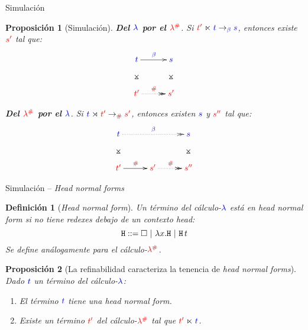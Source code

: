 \documentclass{beamer}
\newtheorem{defes}{Definición}
\newtheorem{proes}{Proposición}
\newcommand{\cLam}[1]{{\color{darkBlue} #1}}
\newcommand{\cDist}[1]{{\color{red} #1}}
\newcommand{\clambdadist}{\cDist{\lambdadist}}
\newcommand{\clambda}{\cLam{\lambda}}
\begin{document}
\begin{frame}{Simulación}
\begin{proes}[Simulación]
\textbf{Del $\clambda$ por el $\clambdadist$}.
Si $\cDist{\tm'} \refines \cLam{\tm} \to_{\cLam{\beta}} \cLam{\tmtwo}$,
entonces existe $\cDist{\tmtwo'}$ tal que:
\[
\xymatrix@=1cm{
 \cLam{\tm} \ar@{}[d]|*=0[@]{\rtimes} \ar[r]^{\cLam{\beta}} & \cLam{\tmtwo} \ar@{}[d]|*=0[@]{\rtimes} \\
 \cDist{\tm'} \ar@{.>>}[r]^{\cDist{\dist}} & \cDist{\tmtwo'} \\
}
\]

\textbf{Del $\clambdadist$ por el $\clambda$}.
Si $\cLam{\tm} \refinedby \cDist{\tm'} \to_{\cDist{\dist}} \cDist{\tmtwo'}$,
entonces existen $\cLam{\tmtwo}$ y $\cDist{\tmtwo''}$ tal que:
\[
\xymatrix@=1cm{
 \cLam{\tm} \ar@{}[d]|*=0[@]{\rtimes} \ar@{.>>}[rr]^{\cLam{\beta}} & & \cLam{\tmtwo} \ar@{}[d]|*=0[@]{\rtimes} \\
 \cDist{\tm'} \ar[r]^{\cDist{\dist}} & \cDist{\tmtwo'} \ar@{.>>}[r]^{\cDist{\dist}} & \cDist{\tmtwo''} \\
}
\]
\end{proes}
\end{frame}

\begin{frame}{Simulación -- \emph{Head normal forms}}
\begin{defes}[\emph{Head normal form}]
Un término del cálculo-$\clambda$ está en \emph{head normal form} si no tiene redexes debajo de un contexto head:
\[ \mathtt{H} ::= \Box \ | \ \lambda x. \mathtt{H} \ | \ \mathtt{H}\, t \]
Se define análogamente para el cálculo-$\clambdadist$.
\end{defes}

\begin{proes}[{\footnotesize La refinabilidad caracteriza la tenencia de \emph{head normal forms}}]
Dado $\cLam{t}$ un término del cálculo-$\clambda$:
\begin{enumerate}
\item El término $\cLam{t}$ tiene una \emph{head normal form}.
\item Existe un término $\cDist{t'}$ del cálculo-$\clambdadist$ tal que $\cDist{t'} \refines \cLam{t}$.
\end{enumerate}
\end{proes}
\end{frame}
\end{document}
